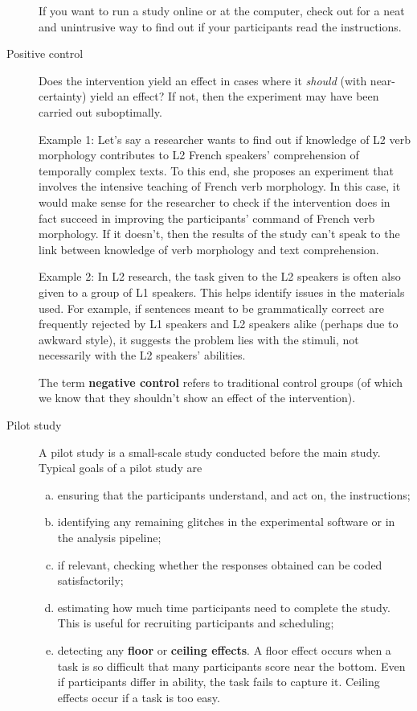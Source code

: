 \documentclass[a4paper]{tufte-book}\usepackage[]{graphicx}\usepackage[]{xcolor}
\newcommand{\term}[1]{\textbf{#1}}
\begin{document}
\begin{description}
 If you want to run a study online or at the computer,
 check out \citet{Oppenheimer2009} for a neat and unintrusive way to find
 out if your participants read the instructions.

 \item[Positive control]
 Does the intervention yield an effect in cases
 where it \emph{should} (with near-certainty) yield
 an effect? If not, then the experiment may have been
 carried out suboptimally.
 
 Example 1: 
 Let's say a researcher wants to find out if knowledge of L2 verb morphology
 contributes to L2 French speakers' comprehension of temporally complex texts.
 To this end, she proposes an experiment that involves the intensive teaching
 of French verb morphology.
 In this case, it would make sense for the researcher to check 
 if the intervention does in fact succeed in improving the participants' 
 command of French verb morphology.
 If it doesn't, then the results of the study can't speak to the link
 between knowledge of verb morphology and text comprehension.
 
 Example 2: In L2 research, the task given to the L2 speakers
 is often also given to a group of L1 speakers.
 This helps identify issues in the materials used.
 For example, 
 if sentences meant to be grammatically correct are frequently rejected by L1 
 speakers and L2 speakers alike (perhaps due to awkward style), 
 it suggests the problem lies with the stimuli, not necessarily with the L2 speakers' abilities.

 The term \term{negative control} refers to traditional control groups 
 (of which we know that they shouldn't show an effect of the intervention).

 \item[Pilot study] A pilot study is a small-scale study conducted before the main study.
 Typical goals of a pilot study are
 \begin{enumerate}[(a)]
 \item ensuring that the participants understand, and act on, the instructions;
 \item identifying any remaining glitches in the experimental software or in the analysis pipeline;
 \item if relevant, checking whether the responses obtained can be coded satisfactorily;
 \item estimating how much time participants need to complete the study.
 This is useful for recruiting participants and scheduling;
 \item detecting any \term{floor} or \term{ceiling effects}.
  A floor effect occurs when a task is so difficult that 
  many participants score near the bottom. 
  Even if participants differ in ability, the task fails to capture it.
  Ceiling effects occur if a task is too easy.
 \end{enumerate}
 
\end{description}
\end{document}
